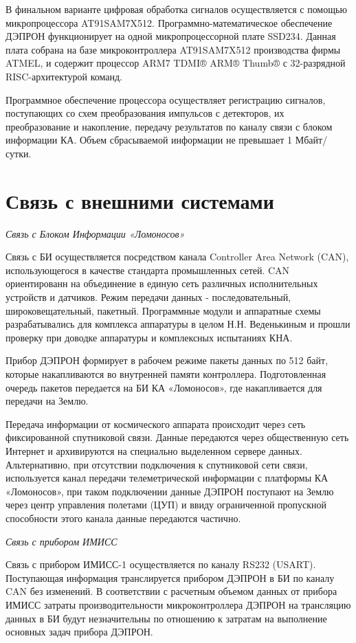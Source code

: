 В финальном варианте цифровая обработка сигналов осуществляется с помощью микропроцессора AT91SAM7X512. Программно-математическое обеспечение ДЭПРОН функционирует на одной микропроцессорной плате SSD234. Данная плата собрана на базе микроконтроллера AT91SAM7X512 производства фирмы ATMEL, и содержит процессор ARM7 TDMI® ARM® Thumb® с 32-разрядной RISC-архитектурой команд.

Программное обеспечение процессора осуществляет регистрацию сигналов, поступающих со схем преобразования импульсов с детекторов, их преобразование и накопление, передачу результатов по каналу связи с блоком информации КА. Объем сбрасываемой информации не превышает 1 Мбайт/сутки.

\section{Связь с внешними системами}
\emph{Связь с Блоком Информации «Ломоносов»}

Связь с БИ осуществляется посредством канала Controller Area Network (CAN), использующегося в качестве стандарта промышленных сетей. CAN ориентированн на объединение в единую сеть различных исполнительных устройств и датчиков. Режим передачи данных - последовательный, широковещательный, пакетный. Программные модули и аппаратные схемы разрабатывались для комплекса аппаратуры в целом Н.Н. Веденькиным и прошли проверку при доводке аппаратуры и комплексных испытаниях КНА.

Прибор ДЭПРОН формирует в рабочем режиме пакеты данных по 512 байт, которые накапливаются во внутренней памяти контроллера. Подготовленная очередь пакетов  передается на БИ КА «Ломоносов», где накапливается для передачи на Землю.

Передача информации от космического аппарата происходит через сеть фиксированной спутниковой связи. Данные передаются через общественную сеть Интернет и архивируются на специально выделенном сервере данных. Альтернативно, при отсутствии подключения к спутниковой сети связи, используется канал передачи телеметрической информации с платформы КА «Ломоносов», при таком подключении данные ДЭПРОН поступают на Землю через центр управления полетами (ЦУП) и ввиду ограниченной пропускной способности этого канала данные передаются частично.

\emph{Связь с прибором ИМИСС}

Связь с прибором ИМИСС-1 осуществляется по каналу RS232 (USART). Поступающая информация транслируется прибором ДЭПРОН в БИ по каналу CAN без изменений. В соответствии с расчетным объемом данных от прибора ИМИСС затраты производительности микроконтроллера ДЭПРОН на трансляцию данных в БИ будут незначительны по отношению к затратам на выполнение основных задач прибора ДЭПРОН.

